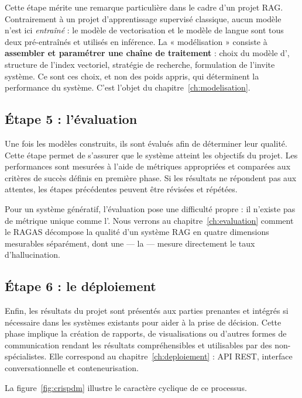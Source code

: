 Cette étape mérite une remarque particulière dans le cadre d'un projet RAG.
Contrairement à un projet d'apprentissage supervisé classique, aucun modèle
n'est ici \emph{entraîné} : le modèle de vectorisation et le modèle de langue
sont tous deux pré-entraînés et utilisés en inférence. La « modélisation »
consiste à \textbf{assembler et paramétrer une chaîne de traitement} :
choix du modèle d', structure de l'index vectoriel, stratégie de
recherche, formulation de l'invite système. Ce sont ces choix, et non des poids
appris, qui déterminent la performance du système. C'est l'objet du
chapitre~\ref{ch:modelisation}.

\subsection*{Étape 5 : l'évaluation}

Une fois les modèles construits, ils sont évalués afin de déterminer leur
qualité. Cette étape permet de s'assurer que le système atteint les objectifs du
projet. Les performances sont mesurées à l'aide de métriques appropriées et
comparées aux critères de succès définis en première phase. Si les résultats ne
répondent pas aux attentes, les étapes précédentes peuvent être révisées et
répétées.

Pour un système génératif, l'évaluation pose une difficulté propre : il n'existe
pas de métrique unique comme l'. Nous verrons au
chapitre~\ref{ch:evaluation} comment le  RAGAS décompose la
qualité d'un système RAG en quatre dimensions mesurables séparément, dont une
--- la  --- mesure directement le taux d'hallucination.

\subsection*{Étape 6 : le déploiement}

Enfin, les résultats du projet sont présentés aux parties prenantes et intégrés
si nécessaire dans les systèmes existants pour aider à la prise de décision.
Cette phase implique la création de rapports, de visualisations ou d'autres
formes de communication rendant les résultats compréhensibles et utilisables par
des non-spécialistes. Elle correspond au chapitre~\ref{ch:deploiement} : API
REST, interface conversationnelle et conteneurisation.

\vspace{0.5cm}

La figure~\ref{fig:crispdm} illustre le caractère cyclique de ce processus.

